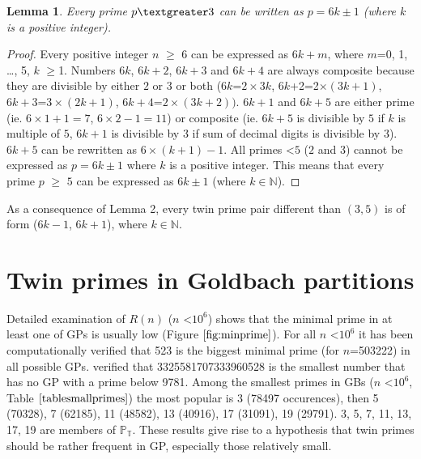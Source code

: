 \documentclass[10pt,twocolumn]{article}
\newtheorem{lemma}[theorem]{Lemma}
\begin{document}
\begin{lemma}
Every prime $p \textgreater 3$ can be written as $p=6k \pm 1$ (where $k$ is a positive integer).
\end{lemma}
\begin{proof}
Every positive integer $n$ $\geq$ 6 can be expressed as $6k+m$, where $m$=0, 1, \ldots, 5, $k$ $\geq$1. Numbers $6k$, $6k+2$, $6k+3$ and $6k+4$ are always composite because they are divisible by either $2$ or $3$ or both ($6k$=$2\times 3k$, $6k$+2=2$\times (3k+1)$, $6k+3$=$3\times (2k+1)$, $6k+4$=$2 \times (3k+2))$. $6k+1$ and $6k+5$ are either prime (ie. $6 \times 1+1=7$, $6 \times 2-1=11$) or composite (ie. $6k+5$ is divisible by $5$ if $k$ is multiple of $5$, $6k+1$ is divisible by $3$ if sum of decimal digits is divisible by $3$). $6k+5$ can be rewritten as $6 \times (k+1)-1$. All primes \textless $5$ ($2$ and $3$) cannot be expressed as $p=6k \pm 1$ where $k$ is a positive integer. This means that every prime $p$ $\geq$ $5$ can be expressed as $6k \pm 1$ (where $k \in \mathbb{N}$).
\end{proof}

As a consequence of Lemma 2, every twin prime pair different than $(3, 5)$ is of form ($6k - 1$, $6k + 1$), where $k \in \mathbb{N}$.

\section{Twin primes in Goldbach partitions}

Detailed examination of $R(n)$ ($n$ \textless $10^6$) shows that the minimal prime in at least one of GPs is usually low (Figure $\ref{fig:minprime}$). For all $n$ \textless $10^6$  it has been computationally verified that 523 is the biggest minimal prime (for $n$=503222) in all possible GPs. \cite{oliveira2012} verified that 3325581707333960528 is the smallest number that has no GP with a prime below 9781. Among the smallest primes in GBs ($n$ \textless $10^6$, Table $\ref{tablesmallprimes}$) the most popular is 3 (78497 occurences), then 5 (70328), 7 (62185), 11 (48582), 13 (40916), 17 (31091), 19 (29791). 3, 5, 7, 11, 13, 17, 19 are members of $\mathbb{P_T}$. These results give rise to a hypothesis that twin primes should be rather frequent in GP, especially those relatively small.\par
\end{document}
